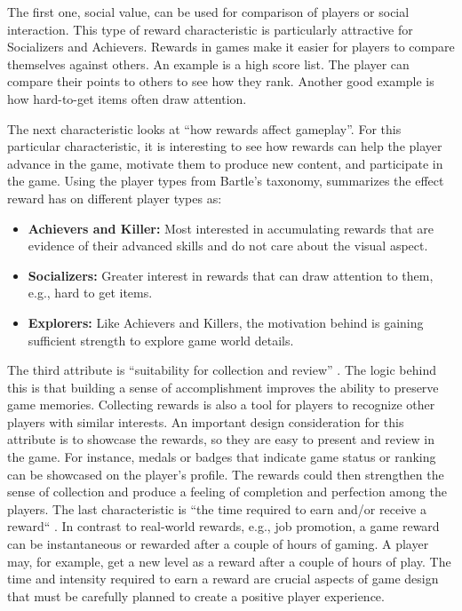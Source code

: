 The first one, social value, can be used for comparison of players or social interaction. This type of reward characteristic is particularly attractive for Socializers and Achievers. Rewards in games make it easier for players to compare themselves against others. An example is a high score list. The player can compare their points to others to see how they rank. Another good example is how hard-to-get items often draw attention. 

The next characteristic looks at “how rewards affect gameplay”. For this particular characteristic, it is interesting to see how rewards can help the player advance in the game, motivate them to produce new content, and participate in the game. Using the player types from Bartle’s taxonomy, \citet{wang_game_2011} summarizes the effect reward has on different player types as:

\begin{itemize}
    \item \textbf{Achievers and Killer:} Most interested in accumulating rewards that are evidence of their advanced skills and do not care about the visual aspect.
    \item \textbf{Socializers:} Greater interest in rewards that can draw attention to them, e.g., hard to get items.
    \item \textbf{Explorers:} Like Achievers and Killers, the motivation behind is gaining sufficient strength to explore game world details.
\end{itemize}

The third attribute is “suitability for collection and review” \cite{wang_game_2011}. The logic behind this is that building a sense of accomplishment improves the ability to preserve game memories. Collecting rewards is also a tool for players to recognize other players with similar interests. An important design consideration for this attribute is to showcase the rewards, so they are easy to present and review in the game. For instance, medals or badges that indicate game status or ranking can be showcased on the player’s profile. The rewards could then strengthen the sense of collection and produce a feeling of completion and perfection among the players.
The last characteristic is “the time required to earn and/or receive a reward“ \cite{wang_game_2011}. In contrast to real-world rewards, e.g., job promotion, a game reward can be instantaneous or rewarded after a couple of hours of gaming. A player may, for example, get a new level as a reward after a couple of hours of play. The time and intensity required to earn a reward are crucial aspects of game design that must be carefully planned to create a positive player experience.


